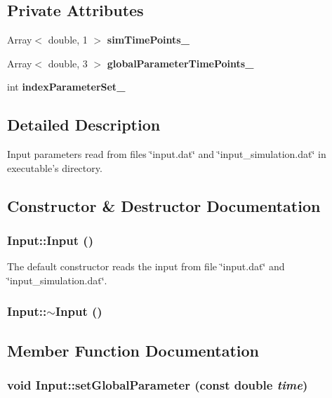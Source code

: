 \subsection*{Private Attributes}
\begin{CompactItemize}
\item 
Array$<$ double, 1 $>$ {\bf simTimePoints\_\-}
\item 
Array$<$ double, 3 $>$ {\bf globalParameterTimePoints\_\-}
\item 
int {\bf indexParameterSet\_\-}
\end{CompactItemize}


\subsection{Detailed Description}
Input parameters read from files \char`\"{}input.dat\char`\"{} and \char`\"{}input\_\-simulation.dat\char`\"{} in executable's directory. 

\subsection{Constructor \& Destructor Documentation}
\subsubsection{\setlength{\rightskip}{0pt plus 5cm}Input::Input ()}\label{classInput_bae3f379d3f157cf42dc857309832dba}


The default constructor reads the input from file \char`\"{}input.dat\char`\"{} and \char`\"{}input\_\-simulation.dat\char`\"{}. 

\subsubsection{\setlength{\rightskip}{0pt plus 5cm}Input::$\sim$Input ()}\label{classInput_f2db35ba67c8a8ccd23bef6a482fc291}




\subsection{Member Function Documentation}
\subsubsection{\setlength{\rightskip}{0pt plus 5cm}void Input::setGlobalParameter (const double {\em time})}\label{classInput_a208108461c7017b929db50cec33175d}


